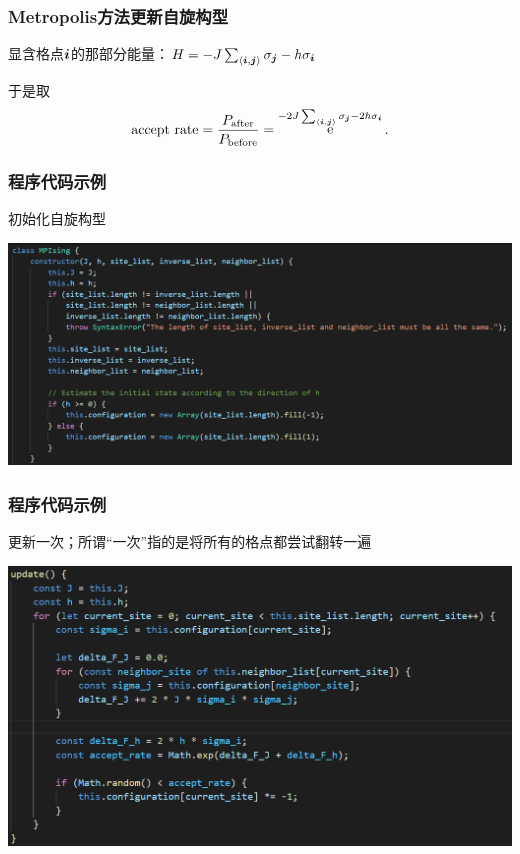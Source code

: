\documentclass[UTF8]{ctexbeamer}
\DeclareMathOperator{\ee}{e}
\begin{document}
\begin{frame}
\frametitle{Metropolis方法更新自旋构型}

显含格点$\vb*{i}$的那部分能量：$H = - J \sum_{\langle \vb*{i}, \vb*{j} \rangle} \sigma_{\vb*{j}} - h \sigma_{\vb*{i}} $

\begin{center}
     
\end{center}   

于是取
\begin{equation}
    \text{accept rate} = \frac{P_\text{after}}{P_\text{before}} = \ee^{- 2 J \sum_{\langle \vb*{i}, \vb*{j} \rangle} \sigma_{\vb*{j}} - 2 h \sigma_{\vb*{i}} }.
\end{equation}

\end{frame}

\begin{frame}
\frametitle{程序代码示例}

初始化自旋构型

\begin{center}
    \includegraphics[width=\textwidth]{code-MPIsing-initial.PNG}
\end{center}

\end{frame}

\begin{frame}
\frametitle{程序代码示例}

更新一次；所谓“一次”指的是将所有的格点都尝试翻转一遍

\begin{center}
    \includegraphics[width=\textwidth]{code-MPIsing-update.PNG}
\end{center}    

\end{frame}
\end{document}
